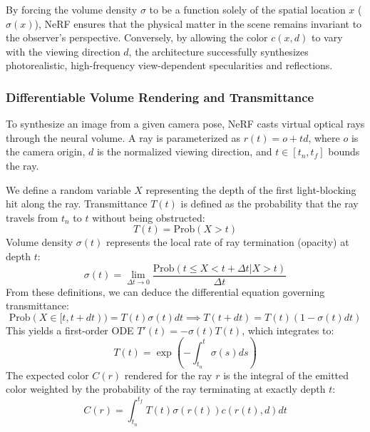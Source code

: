 By forcing the volume density $\sigma$ to be a function solely of the spatial location $x$ ($\sigma(x)$), NeRF ensures that the physical matter in the scene remains invariant to the observer's perspective. Conversely, by allowing the color $c(x, d)$ to vary with the viewing direction $d$, the architecture successfully synthesizes photorealistic, high-frequency view-dependent specularities and reflections.

\subsubsection{Differentiable Volume Rendering and Transmittance}

To synthesize an image from a given camera pose, NeRF casts virtual optical rays through the neural volume. A ray is parameterized as $r(t) = o + t d$, where $o$ is the camera origin, $d$ is the normalized viewing direction, and $t \in [t_n, t_f]$ bounds the ray.

We define a random variable $X$ representing the depth of the first light-blocking hit along the ray. Transmittance $T(t)$ is defined as the probability that the ray travels from $t_n$ to $t$ without being obstructed:
\begin{equation}
T(t) = \text{Prob}(X > t)
\end{equation}
Volume density $\sigma(t)$ represents the local rate of ray termination (opacity) at depth $t$:
\begin{equation}
\sigma(t) = \lim_{\Delta t \to 0} \frac{\text{Prob}(t \le X < t + \Delta t | X > t)}{\Delta t}
\end{equation}
From these definitions, we can deduce the differential equation governing transmittance:
\begin{equation}
\text{Prob}(X \in [t, t + dt)) = T(t)\sigma(t)dt \implies T(t + dt) = T(t)(1 - \sigma(t)dt)
\end{equation}
This yields a first-order ODE $T'(t) = -\sigma(t)T(t)$, which integrates to:
\begin{equation}
T(t) = \exp\left( - \int_{t_n}^t \sigma(s) ds \right)
\end{equation}
The expected color $C(r)$ rendered for the ray $r$ is the integral of the emitted color weighted by the probability of the ray terminating at exactly depth $t$:
\begin{equation}
C(r) = \int_{t_n}^{t_f} T(t) \sigma(r(t)) c(r(t), d) dt
\end{equation}

